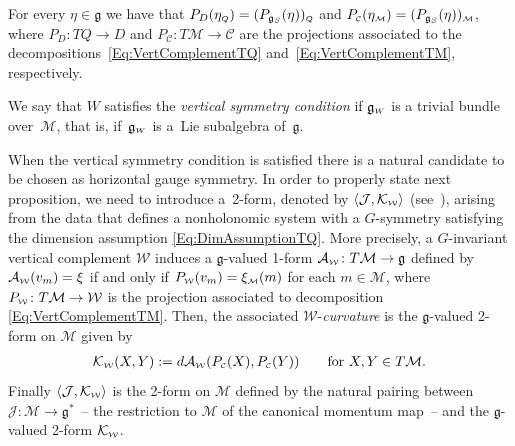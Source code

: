 \documentclass[pdftex]{sigma}
\numberwithin{equation}{section}
\def\W{\mathcal{W}}
\def\M{\mathcal{M}}
\def\J{\mathcal{J}}
\def\C{\mathcal{C}}
\def\g{\mathfrak{g}}
\def\subW{{\mbox{\tiny{$\W$}}}}
\def\subC{{\mbox{\tiny{$\C$}}}}
\def\subM{{\mbox{\tiny{$\M$}}}}
\def\subWW{{\mbox{\tiny{$W$}}}}
\begin{document}
\begin{Remark} \label{R:Proj} For every $\eta\in \mathfrak{g}$ we have that $P_{D}(\eta_{\mbox{\tiny{$Q$}}}) = ( P_{\mathfrak{g}_S}(\eta))_{\mbox{\tiny{$Q$}}}$ and  $P_{\subC} (\eta_\subM) = ( P_{\mathfrak{g}_S}(\eta)  )_\subM$,
 where $P_D \colon TQ \to D$ and $P_\C \colon T\M\to \C$ are the projections associated
 to the decompositions~\eqref{Eq:VertComplementTQ} and~\eqref{Eq:VertComplementTM},
 respectively.
\end{Remark}

 \begin{Definition} \label{D:VertSym}
We say that $W$ satisf\/ies the
{\it vertical symmetry condition} if $\mathfrak{g}_\subWW$ is a trivial bundle over~$\M$,
that is, if~$\mathfrak{g}_\subWW$ is a~Lie subalgebra of~$\mathfrak{g}$.
\end{Definition}

When the vertical symmetry condition is satisf\/ied there is a natural candidate
to be chosen as horizontal gauge symmetry. In order to properly state next proposition,
we need to introduce a~2-form, denoted by
$\langle \mathcal{J}, \mathcal{K}_\subW \rangle$ (see~\cite{Paula}),
arising from the data that def\/ines a nonholonomic system with a
$G$-symmetry satisfying the dimension assumption \eqref{Eq:DimAssumptionTQ}.
More precisely, a $G$-invariant vertical complement $\W$ induces a $\g$-valued
1-form ${\mathcal A}_\subW\colon  T\M \to \mathfrak{g}$ def\/ined by
${\mathcal A}_\subW (v_m) = \xi$ if and only if $P_\subW (v_m) = \xi_\subM(m)$
for each $m\in\M$, where $P_\subW \colon T\M \to \W$ is the projection associated to decomposition \eqref{Eq:VertComplementTM}. Then, the associated $\W$-{\it curvature} is the $\mathfrak{g}$-valued
2-form on $\M$ given by
\begin{gather*} %
\mathcal{K}_\subW(X,Y):=  d {\mathcal A}_\subW(P_\subC (X),P_\subC (Y)) \qquad \mbox{for} \ X,Y \in T\M.
\end{gather*}
Finally $\langle \mathcal{J}, \mathcal{K}_\subW \rangle$ is the 2-form on $\M$
def\/ined by the natural pairing between $\J \colon \M\to \g^*$~-- the restriction to $\M$ of the canonical momentum map~--
and the $\mathfrak{g}$-valued 2-form $\mathcal{K}_\subW$.
\end{document}
